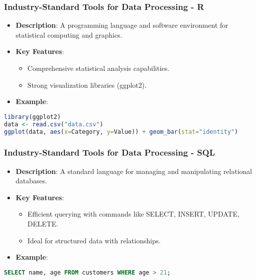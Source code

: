 \documentclass[aspectratio=169]{beamer}
\begin{document}
\begin{frame}[fragile]
    \frametitle{Industry-Standard Tools for Data Processing - R}
    \begin{itemize}
        \item \textbf{Description}: A programming language and software environment for statistical computing and graphics.
        \item \textbf{Key Features}:
        \begin{itemize}
            \item Comprehensive statistical analysis capabilities.
            \item Strong visualization libraries (ggplot2).
        \end{itemize}
        \item \textbf{Example}:
        \end{itemize}
        
        \begin{lstlisting}[language=R]
library(ggplot2)
data <- read.csv("data.csv")
ggplot(data, aes(x=Category, y=Value)) + geom_bar(stat="identity")
        \end{lstlisting}
\end{frame}

\begin{frame}[fragile]
    \frametitle{Industry-Standard Tools for Data Processing - SQL}
    \begin{itemize}
        \item \textbf{Description}: A standard language for managing and manipulating relational databases.
        \item \textbf{Key Features}:
        \begin{itemize}
            \item Efficient querying with commands like SELECT, INSERT, UPDATE, DELETE.
            \item Ideal for structured data with relationships.
        \end{itemize}
        \item \textbf{Example}:
        \end{itemize}
        
        \begin{lstlisting}[language=SQL]
SELECT name, age FROM customers WHERE age > 21;
        \end{lstlisting}
\end{frame}
\end{document}
